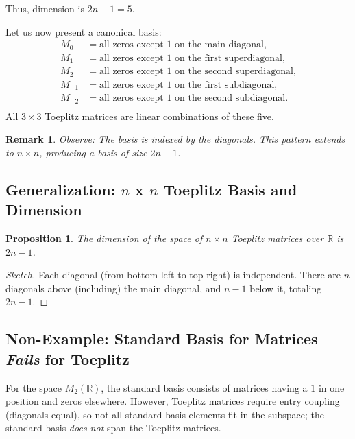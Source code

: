 \documentclass[12pt]{article}
\newtheorem{proposition}[theorem]{Proposition}
\newtheorem{remark}[theorem]{Remark}
\begin{document}
Thus, dimension is $2n-1 = 5$.

Let us now present a canonical basis:
\[
\begin{aligned}
M_0 &= \text{all zeros except $1$ on the main diagonal,} \\
M_1 &= \text{all zeros except $1$ on the first superdiagonal,} \\
M_2 &= \text{all zeros except $1$ on the second superdiagonal,} \\
M_{-1} &= \text{all zeros except $1$ on the first subdiagonal,} \\
M_{-2} &= \text{all zeros except $1$ on the second subdiagonal.} \\
\end{aligned}
\]
All $3 \times 3$ Toeplitz matrices are linear combinations of these five.

\begin{remark}
Observe: The basis is indexed by the diagonals. This pattern extends to $n \times n$, producing a basis of size $2n-1$.
\end{remark}

\subsection{Generalization: \texorpdfstring{$n$}{n} x \texorpdfstring{$n$}{n} Toeplitz Basis and Dimension}
\begin{proposition}
The dimension of the space of $n \times n$ Toeplitz matrices over $\mathbb{R}$ is $2n-1$.
\end{proposition}
\begin{proof}[Sketch]
Each diagonal (from bottom-left to top-right) is independent. There are $n$ diagonals above (including) the main diagonal, and $n-1$ below it, totaling $2n-1$.
\end{proof}

\subsection{Non-Example: Standard Basis for Matrices \emph{Fails} for Toeplitz}

For the space $M_2(\mathbb{R})$, the standard basis consists of matrices having a $1$ in one position and zeros elsewhere. However, Toeplitz matrices require entry coupling (diagonals equal), so not all standard basis elements fit in the subspace; the standard basis \emph{does not} span the Toeplitz matrices.

\end{document}
